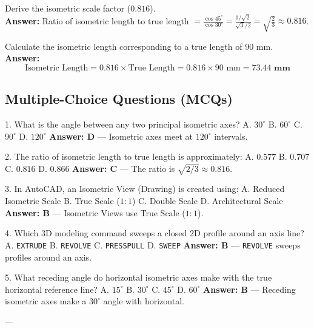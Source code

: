 \begin{vivaqa}
Derive the isometric scale factor ($0.816$).\\[4pt]
\textbf{Answer:} Ratio of isometric length to true length $= \frac{\cos 45^\circ}{\cos 30^\circ} = \frac{1/\sqrt{2}}{\sqrt{3}/2} = \sqrt{\frac{2}{3}} \approx \mathbf{0.816}$.
\end{vivaqa}

\begin{vivaqa}
Calculate the isometric length corresponding to a true length of $90\text{ mm}$.\\[4pt]
\textbf{Answer:}  
$$\text{Isometric Length} = 0.816 \times \text{True Length} = 0.816 \times 90\text{ mm} = \mathbf{73.44\text{ mm}}$$
\end{vivaqa}

\subsection{Multiple-Choice Questions (MCQs)}

1. What is the angle between any two principal isometric axes?  
   A. $30^\circ$  
   B. $60^\circ$  
   C. $90^\circ$  
   D. $120^\circ$  
   \textbf{Answer: D} — Isometric axes meet at $120^\circ$ intervals.

2. The ratio of isometric length to true length is approximately:  
   A. $0.577$  
   B. $0.707$  
   C. $0.816$  
   D. $0.866$  
   \textbf{Answer: C} — The ratio is $\sqrt{2/3} \approx 0.816$.

3. In AutoCAD, an Isometric View (Drawing) is created using:  
   A. Reduced Isometric Scale  
   B. True Scale ($1:1$)  
   C. Double Scale  
   D. Architectural Scale  
   \textbf{Answer: B} — Isometric Views use True Scale ($1:1$).

4. Which 3D modeling command sweeps a closed 2D profile around an axis line?  
   A. \texttt{EXTRUDE}  
   B. \texttt{REVOLVE}  
   C. \texttt{PRESSPULL}  
   D. \texttt{SWEEP}  
   \textbf{Answer: B} — \texttt{REVOLVE} sweeps profiles around an axis.

5. What receding angle do horizontal isometric axes make with the true horizontal reference line?  
   A. $15^\circ$  
   B. $30^\circ$  
   C. $45^\circ$  
   D. $60^\circ$  
   \textbf{Answer: B} — Receding isometric axes make a $30^\circ$ angle with horizontal.

---

